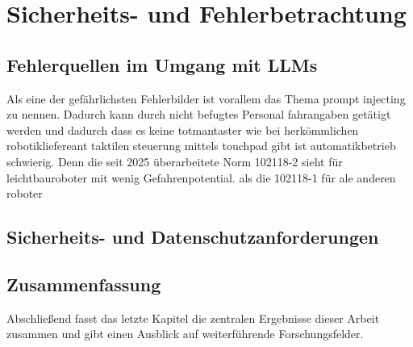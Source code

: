 \chapter{Sicherheits- und Fehlerbetrachtung}

\section{Fehlerquellen im Umgang mit LLMs}
Als eine der gefährlichsten Fehlerbilder ist vorallem das Thema prompt injecting zu nennen. Dadurch kann durch nicht befugtes Personal fahrangaben getätigt werden und dadurch dass es keine totmantaster wie bei herkömmlichen robotikliefereant taktilen steuerung mittels touchpad gibt ist automatikbetrieb schwierig. Denn die seit 2025 überarbeitete Norm 102118-2 sieht für leichtbauroboter mit wenig Gefahrenpotential. als die 102118-1 für ale anderen roboter

\section{Sicherheits- und Datenschutzanforderungen}


\section{Zusammenfassung}

Abschließend fasst das letzte Kapitel die zentralen Ergebnisse dieser Arbeit zusammen und gibt einen Ausblick auf weiterführende Forschungsfelder.
